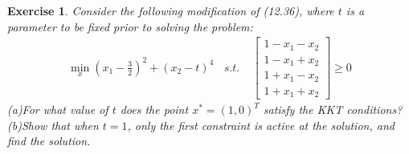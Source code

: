 \documentclass[11pt,a4paper]{article}
\renewcommand{\(}{\left(}
\renewcommand{\)}{\right)}
\newtheorem{exercise}{Exercise}
\begin{document}
  \setcounter{exercise}{14}
  \begin{exercise}
Consider the following modification of (12.36), where $t$ is a parameter to be fixed prior to solving the problem:
\begin{align*}
\min_{x} (x_{1}-\frac{3}{2})^{2}+(x_{2}-t)^{4}~~~~ s.t.~~~~~\begin{bmatrix}
1-x_{1}-x_{2}\\
1-x_{1}+x_{2}\\
1+x_{1}-x_{2}\\
1+x_{1}+x_{2}
\end{bmatrix}\geq0
\end{align*}
(a)For what value of $t$ does the point $x^{*}=(1,0)^{T}$ satisfy the KKT conditions?\\
(b)Show that when $t=1$, only the first constraint is active at the solution, and find the solution.
  \end{exercise}  
\end{document}
